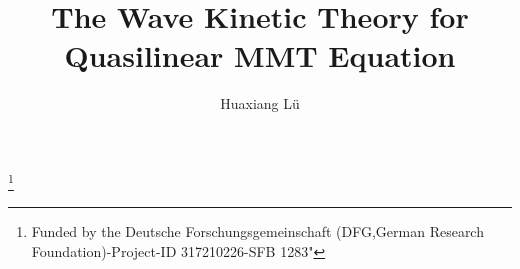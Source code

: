 \documentclass[UTF-8,reqno]{amsart}
\numberwithin{equation}{section}
\theoremstyle{definition}
\begin{document}
\title[The Wave  Kinetic Theory for Quasi MMT]{The Wave  Kinetic Theory for Quasilinear MMT %
Equation}

\author{Huaxiang L\"u}
\address[H. L\"u]{Academy of Mathematics and Systems Science, Chinese Academy of Sciences, Beijing 100190, China, and Fakult\"at f\"ur Mathematik, Bielefeld Universit\"at, D 33615 Bielefeld, Germany}

 

\thanks{%
Funded by the Deutsche Forschungsgemeinschaft (DFG,German Research Foundation)-Project-ID 317210226-SFB 1283"
}
\end{document}
